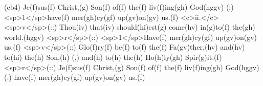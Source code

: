 (cb4) Je(f)sus(f) Christ,(g) Son(f) of(f) the(f) liv(f)ing(gh) God(hggv) (;) <sp>1</sp>have(f) mer(gh)cy(gf) up(gv)on(gv) us.(f) <c>ii.</c> <sp>v</sp>(::) Thou(iv) that(iv) should(hi)est(g) come(hv) in(g)to(f) the(gh) world.(hggv) <sp>r</sp>(::) <sp>1</sp>Have(f) mer(gh)cy(gf) up(gv)on(gv) us.(f) <sp>v</sp>(::) Glo(f)ry(f) be(f) to(f) the(f) Fa(gv)ther,(hv) and(hv) to(hi) the(h) Son,(h) (,) and(h) to(h) the(h) Ho(h)ly(gh) Spir(g)it.(f) <sp>r</sp>(::) Je(f)sus(f) Christ,(g) Son(f) of(f) the(f) liv(f)ing(gh) God(hggv) (;) have(f) mer(gh)cy(gf) up(gv)on(gv) us.(f)